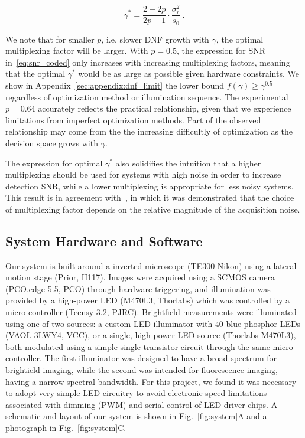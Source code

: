 \begin{equation}
    \label{eq:optimal_gamma}
    \gamma^* = \frac{2-2p}{2p-1} \cdot \frac{\sigma_r^2}{\bar{s}_0}\:.
\end{equation}

We note that for smaller $p$, i.e. slower DNF growth with $\gamma$, the optimal multiplexing factor will be larger. 
With $p=0.5$, the expression for SNR in~\eqref{eq:snr_coded} only increases with increasing multiplexing factors, meaning that the optimal $\gamma^*$ would be as large as possible given hardware constraints. 
We show in Appendix~\ref{sec:appendix:dnf_limit} the lower bound $f(\gamma)\geq \gamma^{0.5}$ regardless of optimization method or illumination sequence.
The experimental $p=0.64$ accurately reflects the practical relationship, given that we experience limitations from imperfect optimization methods. Part of the observed relationship may come from the the increasing difficultly of optimization as the decision space grows with $\gamma$. 

The expression for optimal $\gamma^*$ also solidifies the intuition that a higher multiplexing should be used for systems with high noise in order to increase detection SNR, while a lower multiplexing is appropriate for less noisy systems. This result is in agreement with~\cite{agrawal2009optimal}, in which it was demonstrated that the choice of multiplexing factor depends on the relative magnitude of the acquisition noise. 

\subsection{System Hardware and Software} \label{sec:highthroughput:hardware}
Our system is built around a inverted microscope (TE300 Nikon) using a lateral motion stage (Prior, H117). Images were acquired using a SCMOS camera (PCO.edge 5.5, PCO) through hardware triggering, and illumination was provided by a high-power LED (M470L3, Thorlabs) which was controlled by a micro-controller (Teensy 3.2, PJRC). Brightfield measurements were illuminated using one of two sources: a custom LED illuminator with 40 blue-phosphor LEDs (VAOL-3LWY4, VCC), or a single, high-power LED source (Thorlabs M470L3), both modulated using a simple single-transistor circuit through the same micro-controller. The first illuminator was designed to have a broad spectrum for brightield imaging, while the second was intended for fluorescence imaging, having a narrow spectral bandwidth. For this project, we found it was necessary to adopt very simple LED circuitry to avoid electronic speed limitations associated with dimming (PWM) and serial control of LED driver chips. A schematic and layout of our system is shown in Fig.~\ref{fig:system}A and a photograph in Fig.~\ref{fig:system}C.

